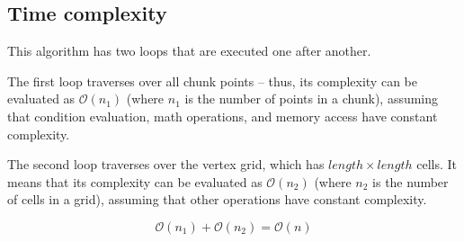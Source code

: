 \subsection{Time complexity}

This algorithm has two loops that are executed one after another.

The first loop traverses over all chunk points – thus, its complexity can be evaluated as $\mathcal{O}(n_1)$ (where $n_1$ is the number of points in a chunk), assuming that condition evaluation, math operations, and memory access have constant complexity.

The second loop traverses over the vertex grid, which has $length \times length$ cells. It means that its complexity can be evaluated as $\mathcal{O}(n_2)$ (where $n_2$ is the number of cells in a grid), assuming that other operations have constant complexity.

$$\mathcal{O}(n_1) + \mathcal{O}(n_2) = \mathcal{O}(n)$$

